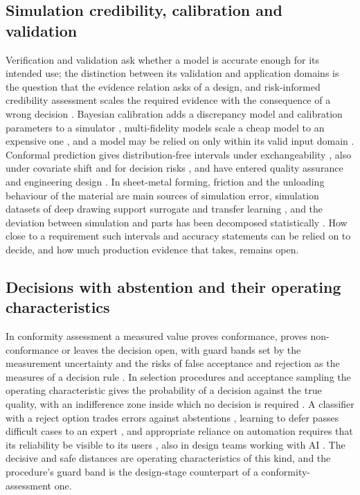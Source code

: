 \documentclass[pdflatex,sn-basic,lineno]{sn-jnl}
\begin{document}
\subsection{Simulation credibility, calibration and validation}

Verification and validation ask whether a model is accurate enough for its intended use; the distinction between its validation and application domains \citep{oberkampf2010verification} is the question that the evidence relation asks of a design, and risk-informed credibility assessment scales the required evidence with the consequence of a wrong decision \citep{asme2018assessing}. Bayesian calibration adds a discrepancy model and calibration parameters to a simulator \citep{kennedy2001bayesian}, multi-fidelity models scale a cheap model to an expensive one \citep{kennedy2000predicting}, and a model may be relied on only within its valid input domain \citep{malak2010using}. Conformal prediction gives distribution-free intervals under exchangeability \citep{lei2018distribution, barber2021predictive}, also under covariate shift \citep{tibshirani2019conformal} and for decision risks \citep{angelopoulos2024conformal}, and have entered quality assurance \citep{heddoub2026conformal} and engineering design \citep{zong2026trustworthy}. In sheet-metal forming, friction \citep{hol2012advanced} and the unloading behaviour of the material \citep{yoshida2002model} are main sources of simulation error, simulation datasets of deep drawing support surrogate and transfer learning \citep{baum2025ddacs, heinzelmann2025comprehensive}, and the deviation between simulation and parts has been decomposed statistically \citep{baum2026statistical}. How close to a requirement such intervals and accuracy statements can be relied on to decide, and how much production evidence that takes, remains open.

\subsection{Decisions with abstention and their operating characteristics}

In conformity assessment a measured value proves conformance, proves non-conformance or leaves the decision open, with guard bands set by the measurement uncertainty and the risks of false acceptance and rejection as the measures of a decision rule \citep{iso2017decision}. In selection procedures and acceptance sampling the operating characteristic gives the probability of a decision against the true quality, with an indifference zone inside which no decision is required \citep{bechhofer1954single}. A classifier with a reject option trades errors against abstentions \citep{chow1970optimum, geifman2017selective}, learning to defer passes difficult cases to an expert \citep{madras2018predict}, and appropriate reliance on automation requires that its reliability be visible to its users \citep{lee2004trust}, also in design teams working with AI \citep{zhang2021cautionary}. The decisive and safe distances are operating characteristics of this kind, and the procedure's guard band is the design-stage counterpart of a conformity-assessment one.
\end{document}
